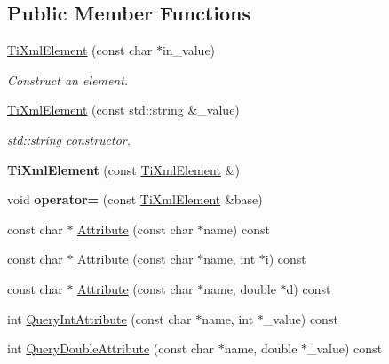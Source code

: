 \subsection*{Public Member Functions}
\begin{DoxyCompactItemize}
\item 
\hypertarget{class_ti_xml_element_a01bc3ab372d35da08efcbbe65ad90c60}{
\hyperlink{class_ti_xml_element_a01bc3ab372d35da08efcbbe65ad90c60}{TiXmlElement} (const char $\ast$in\_\-value)}
\label{class_ti_xml_element_a01bc3ab372d35da08efcbbe65ad90c60}

\begin{DoxyCompactList}\small\item\em Construct an element. \item\end{DoxyCompactList}\item 
\hypertarget{class_ti_xml_element_a40fc2e3c1a955e2f78e1a32350d180e7}{
\hyperlink{class_ti_xml_element_a40fc2e3c1a955e2f78e1a32350d180e7}{TiXmlElement} (const std::string \&\_\-value)}
\label{class_ti_xml_element_a40fc2e3c1a955e2f78e1a32350d180e7}

\begin{DoxyCompactList}\small\item\em std::string constructor. \item\end{DoxyCompactList}\item 
\hypertarget{class_ti_xml_element_a1ca4465f3c2eac6a60e641cd7f1d9f7e}{
{\bfseries TiXmlElement} (const \hyperlink{class_ti_xml_element}{TiXmlElement} \&)}
\label{class_ti_xml_element_a1ca4465f3c2eac6a60e641cd7f1d9f7e}

\item 
\hypertarget{class_ti_xml_element_af5cd4156e082ef3bf23adfe0ed173340}{
void {\bfseries operator=} (const \hyperlink{class_ti_xml_element}{TiXmlElement} \&base)}
\label{class_ti_xml_element_af5cd4156e082ef3bf23adfe0ed173340}

\item 
const char $\ast$ \hyperlink{class_ti_xml_element_ae419a442a9701a62b0c3d8fd1cbdd12d}{Attribute} (const char $\ast$name) const 
\item 
const char $\ast$ \hyperlink{class_ti_xml_element_a0ed8348fdc56b72a6b4900ce5bac1849}{Attribute} (const char $\ast$name, int $\ast$i) const 
\item 
const char $\ast$ \hyperlink{class_ti_xml_element_aeaff99d4f0ea5b34f7aee202aad457ba}{Attribute} (const char $\ast$name, double $\ast$d) const 
\item 
int \hyperlink{class_ti_xml_element_aea0bfe471380f281c5945770ddbf52b9}{QueryIntAttribute} (const char $\ast$name, int $\ast$\_\-value) const 
\item 
\hypertarget{class_ti_xml_element_a898d7730ecc341f0bffc7a9dadbf1ce7}{
int \hyperlink{class_ti_xml_element_a898d7730ecc341f0bffc7a9dadbf1ce7}{QueryDoubleAttribute} (const char $\ast$name, double $\ast$\_\-value) const }
\label{class_ti_xml_element_a898d7730ecc341f0bffc7a9dadbf1ce7}


\end{DoxyCompactItemize}
